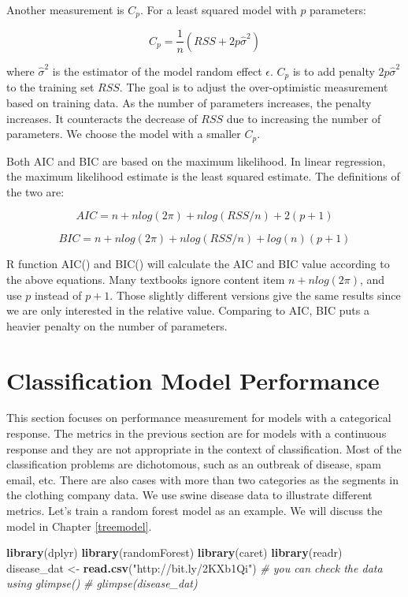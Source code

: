 \documentclass[12pt,]{krantz}
\makeatletter
\newenvironment{Shaded}{\begin{snugshade}}{\end{snugshade}}
\newcommand{\CommentTok}[1]{\textcolor[rgb]{0.37,0.37,0.37}{\textit{#1}}}
\newcommand{\KeywordTok}[1]{\textcolor[rgb]{0.27,0.27,0.27}{\textbf{#1}}}
\newcommand{\NormalTok}[1]{#1}
\newcommand{\StringTok}[1]{\textcolor[rgb]{0.5,0.5,0.5}{#1}}
\newenvironment{kframe}{%
\medskip{}
\setlength{\fboxsep}{.8em}
 \def\at@end@of@kframe{}%
 \ifinner\ifhmode%
  \def\at@end@of@kframe{\end{minipage}}%
  \begin{minipage}{\columnwidth}%
 \fi\fi%
 \def\FrameCommand##1{\hskip\@totalleftmargin \hskip-\fboxsep
 \colorbox{shadecolor}{##1}\hskip-\fboxsep
     \hskip-\linewidth \hskip-\@totalleftmargin \hskip\columnwidth}%
 \MakeFramed {\advance\hsize-\width
   \@totalleftmargin\z@ \linewidth\hsize
   \@setminipage}}%
 {\par\unskip\endMakeFramed%
 \at@end@of@kframe}
\renewenvironment{Shaded}{\begin{kframe}}{\end{kframe}}
\makeatother
\begin{document}
Another measurement is \(C_{p}\). For a least squared model with \(p\) parameters:

\[C_{p}=\frac{1}{n}(RSS+2p\hat{\sigma}^{2})\]

where \(\hat{\sigma}^{2}\) is the estimator of the model random effect \(\epsilon\). \(C_{p}\) is to add penalty \(2p\hat{\sigma}^{2}\) to the training set \(RSS\). The goal is to adjust the over-optimistic measurement based on training data. As the number of parameters increases, the penalty increases. It counteracts the decrease of \(RSS\) due to increasing the number of parameters. We choose the model with a smaller \(C_{p}\).

Both AIC and BIC are based on the maximum likelihood. In linear regression, the maximum likelihood estimate is the least squared estimate. The definitions of the two are:

\[AIC=n+nlog(2\pi)+nlog(RSS/n)+2(p+1)\]

\[BIC=n+nlog(2\pi)+nlog(RSS/n)+log(n)(p+1)\]

R function AIC() and BIC() will calculate the AIC and BIC value according to the above equations. Many textbooks ignore content item \(n+nlog(2\pi)\), and use \(p\) instead of \(p+1\). Those slightly different versions give the same results since we are only interested in the relative value. Comparing to AIC, BIC puts a heavier penalty on the number of parameters.

\hypertarget{classification-model-performance}{%
\section{Classification Model Performance}\label{classification-model-performance}}

This section focuses on performance measurement for models with a categorical response. The metrics in the previous section are for models with a continuous response and they are not appropriate in the context of classification. Most of the classification problems are dichotomous, such as an outbreak of disease, spam email, etc. There are also cases with more than two categories as the segments in the clothing company data. We use swine disease data to illustrate different metrics. Let's train a random forest model as an example. We will discuss the model in Chapter \ref{treemodel}.

\begin{Shaded}
\begin{Highlighting}[]
\KeywordTok{library}\NormalTok{(dplyr)}
\KeywordTok{library}\NormalTok{(randomForest)}
\KeywordTok{library}\NormalTok{(caret)}
\KeywordTok{library}\NormalTok{(readr)}
\NormalTok{disease_dat <-}\StringTok{ }\KeywordTok{read.csv}\NormalTok{(}\StringTok{"http://bit.ly/2KXb1Qi"}\NormalTok{)}
\CommentTok{# you can check the data using glimpse()}
\CommentTok{# glimpse(disease_dat)}
\end{Highlighting}
\end{Shaded}
\end{document}
